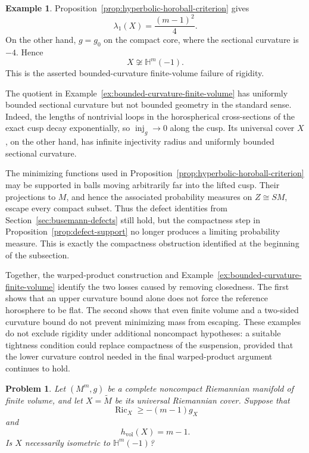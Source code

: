 \documentclass[12pt]{amsart}
\newtheorem{problem}[theorem]{Problem}
\theoremstyle{definition}
\newtheorem{example}[theorem]{Example}
\numberwithin{equation}{section}
\DeclareMathOperator{\Ric}{Ric}
\begin{document}
\begin{example}
Proposition~\ref{prop:hyperbolic-horoball-criterion} gives
\[
  \lambda_1(X)=\frac{(m-1)^2}{4}.
\]
On the other hand, \(g=g_0\) on the compact core, where the sectional
curvature is \(-4\).  Hence
\[
  X\not\cong\mathbb H^m(-1).
\]
This is the asserted bounded-curvature finite-volume failure of rigidity.
\end{example}

The quotient in Example~\ref{ex:bounded-curvature-finite-volume} has
uniformly bounded sectional curvature but not bounded geometry in the
standard sense.  Indeed, the lengths of nontrivial loops in the
horospherical cross-sections of the exact cusp decay exponentially, so
\(\operatorname{inj}_g\to0\) along the cusp.  Its universal cover \(X\),
on the other hand, has infinite injectivity radius and uniformly bounded
sectional curvature.

The minimizing functions used in
Proposition~\ref{prop:hyperbolic-horoball-criterion} may be supported in
balls moving arbitrarily far into the lifted cusp.  Their projections to
\(M\), and hence the associated probability measures on
\(Z\cong SM\), escape every compact subset.  Thus the defect identities
from Section~\ref{sec:busemann-defects} still hold, but the compactness step
in Proposition~\ref{prop:defect-support} no longer produces a limiting
probability measure.  This is exactly the compactness obstruction
identified at the beginning of the subsection.

Together, the warped-product construction and
Example~\ref{ex:bounded-curvature-finite-volume} identify the two losses
caused by removing closedness.  The first shows that an upper curvature
bound alone does not force the reference horosphere to be flat.  The
second shows that even finite volume and a two-sided curvature bound do
not prevent minimizing mass from escaping.  These examples do not exclude
rigidity under additional noncompact hypotheses: a suitable tightness
condition could replace compactness of the suspension, provided that the
lower curvature control needed in the final warped-product argument
continues to hold.

\begin{problem}
\label{prob:finite-volume-entropy-rigidity}
Let \((M^m,g)\) be a complete noncompact Riemannian manifold of finite
volume, and let \(X=\widetilde M\) be its universal Riemannian cover.
Suppose that
\[
  \Ric_X\geq-(m-1)g_X
\]
and
\[
  h_{\mathrm{vol}}(X)=m-1.
\]
Is \(X\) necessarily isometric to \(\mathbb H^m(-1)\)?
\end{problem}
\end{document}
